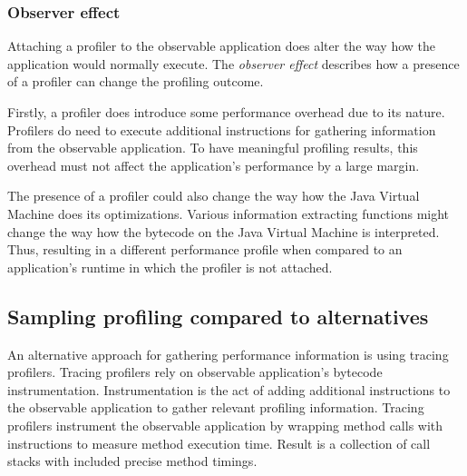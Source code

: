 \documentclass[..thesis.tex]{subfiles}
\begin{document}
\subsubsection{Observer effect}

Attaching a profiler to the observable application does alter the way how the application would normally execute. The \textit{observer effect} describes how a presence of a profiler can change the profiling outcome.
 
Firstly, a profiler does introduce some performance overhead due to its nature. Profilers do need to execute additional instructions for gathering information from the observable application. To have meaningful profiling results, this overhead must not affect the application's performance by a large margin.


The presence of a profiler could also change the way how the Java Virtual Machine does its optimizations. Various information extracting functions  might change the way how the bytecode on the Java Virtual Machine is interpreted. \cite{mytkowicz_evaluating_2010} Thus, resulting in a different performance profile when compared to an application's runtime in which the profiler is not attached.


\subsection{Sampling profiling compared to alternatives}

An alternative approach for gathering performance information is using tracing profilers. Tracing profilers rely on observable application's bytecode instrumentation. Instrumentation is the act of adding additional instructions to the observable application to gather relevant profiling information. Tracing profilers instrument the observable application by wrapping method calls with instructions to measure method execution time. Result is a collection of call stacks with included precise method timings. \cite{whitham_jack}

\end{document}
